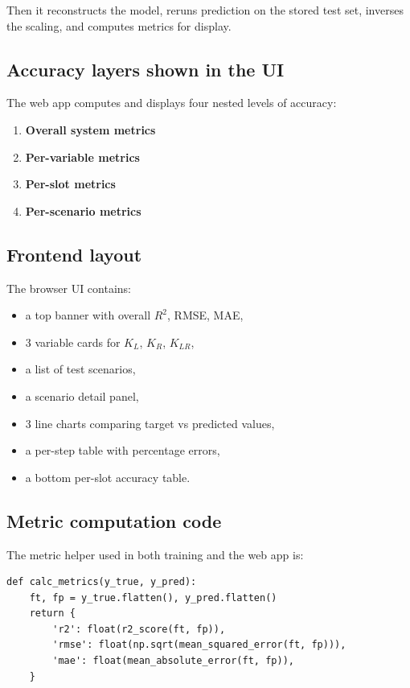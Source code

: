 \documentclass[11pt,a4paper]{article}
\begin{document}
Then it reconstructs the model, reruns prediction on the stored test set, inverses the scaling, and computes metrics for display.

\subsection*{Accuracy layers shown in the UI}
The web app computes and displays four nested levels of accuracy:

\begin{enumerate}[nosep]
    \item \textbf{Overall system metrics}
    \item \textbf{Per-variable metrics}
    \item \textbf{Per-slot metrics}
    \item \textbf{Per-scenario metrics}
\end{enumerate}

\subsection*{Frontend layout}
The browser UI contains:

\begin{itemize}[nosep]
    \item a top banner with overall $R^2$, RMSE, MAE,
    \item 3 variable cards for $K_L$, $K_R$, $K_{LR}$,
    \item a list of test scenarios,
    \item a scenario detail panel,
    \item 3 line charts comparing target vs predicted values,
    \item a per-step table with percentage errors,
    \item a bottom per-slot accuracy table.
\end{itemize}

\subsection*{Metric computation code}
The metric helper used in both training and the web app is:

\begin{lstlisting}
def calc_metrics(y_true, y_pred):
    ft, fp = y_true.flatten(), y_pred.flatten()
    return {
        'r2': float(r2_score(ft, fp)),
        'rmse': float(np.sqrt(mean_squared_error(ft, fp))),
        'mae': float(mean_absolute_error(ft, fp)),
    }
\end{lstlisting}
\end{document}
